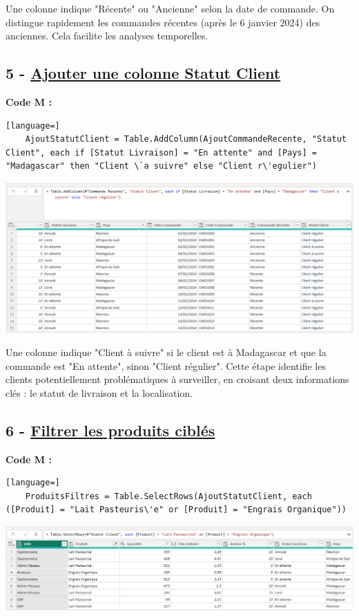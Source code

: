 \documentclass[12pt,a4paper]{article}
\begin{document}
     Une colonne indique "Récente" ou "Ancienne" selon la date de commande. On distingue rapidement les commandes récentes (après le 6 janvier 2024) des anciennes. Cela facilite les analyses temporelles.

	\newpage
    \subsection*{5 - \textbf{\underline{Ajouter une colonne \og Statut Client\fg}}} 
    \textbf{Code M :}
    \begin{lstlisting}[language=]
    AjoutStatutClient = Table.AddColumn(AjoutCommandeRecente, "Statut Client", each if [Statut Livraison] = "En attente" and [Pays] = "Madagascar" then "Client \`a suivre" else "Client r\'egulier")
    \end{lstlisting}

	\includegraphics[width=\textwidth]{etape5.png}


    Une colonne indique "Client à suivre" si le client est à Madagascar et que la commande est "En attente", sinon "Client régulier". Cette étape identifie les clients potentiellement problématiques à surveiller, en croisant deux informations clés : le statut de livraison et la localisation.

    

    \subsection*{6 - \textbf{\underline{Filtrer les produits cibl\'es}}} 
    \textbf{Code M :}
    \begin{lstlisting}[language=]
    ProduitsFiltres = Table.SelectRows(AjoutStatutClient, each ([Produit] = "Lait Pasteuris\'e" or [Produit] = "Engrais Organique"))
    \end{lstlisting}

	\includegraphics[width=\textwidth]{etape6.png}
\end{document}
